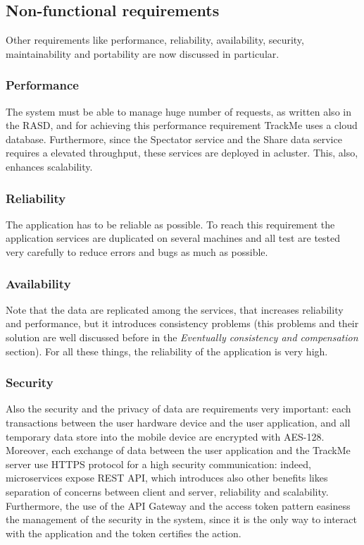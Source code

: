 \subsection{Non-functional requirements}
Other requirements like performance, reliability, availability, security, maintainability and portability are now discussed in particular. \\
\subsubsection{Performance}
The system must be able to manage huge number of requests, as written also in the RASD, and for achieving this performance requirement TrackMe
uses a cloud database. 
Furthermore, since the Spectator service and the Share data service requires a elevated throughput, these services are deployed in acluster.
This, also, enhances scalability.
\subsubsection{Reliability}
The application has to be reliable as possible. To reach this requirement the application services are duplicated on several machines and all test are tested very carefully to reduce errors and bugs as much as possible. 
\subsubsection{Availability}
Note that the data are replicated among the services, that increases reliability and performance, but it introduces consistency problems
(this problems and their solution are well discussed before in the \textit{Eventually consistency and compensation } section).
For all these things, the reliability of the application is very high.
\subsubsection{Security}
Also the security and the privacy of data are requirements very
important: each transactions between the user hardware device and the user application, and all temporary data store into the mobile device
are encrypted with AES-128. Moreover, each exchange of data between the user application and the TrackMe server use HTTPS protocol for a high
security communication: indeed, microservices expose REST API, which introduces also other benefits likes separation of concerns between
client and server, reliability and scalability. 
Furthermore, the use of the API Gateway and the access token pattern easiness the management of the security in the system, since it is the
only way to interact with the application and the token certifies the action.
